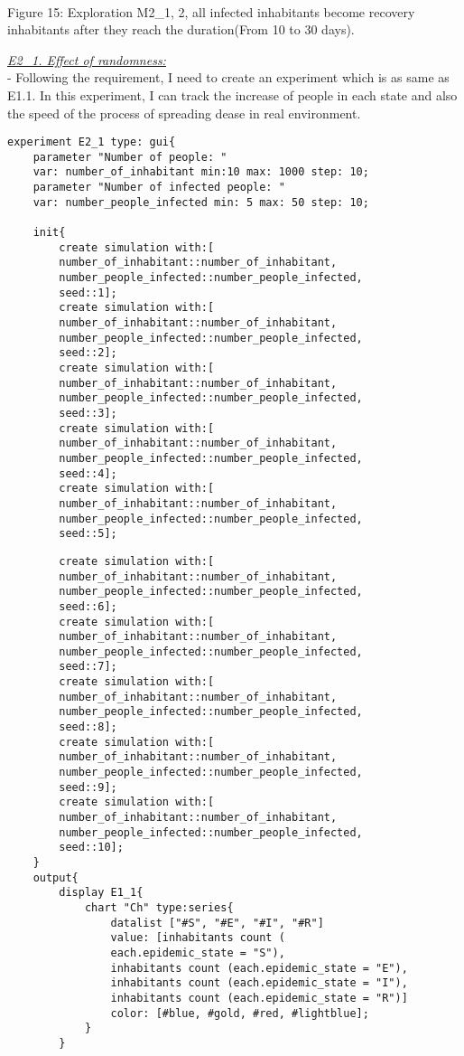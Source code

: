 \documentclass{article}
\begin{document}
\\
\caption{Figure 15: Exploration M2\_1, 2, all infected inhabitants become recovery inhabitants after they reach the duration(From 10 to 30 days).} 
\begin{pic15}
\newpage
\raggedright\underline{\textit{E2\_1. Effect of randomness:}}
\\- Following the requirement, I need to create an experiment which is as same as E1.1. In this experiment, I can track the increase of people in each state and also the speed of the process of spreading dease in real environment.
\\[1\baselineskip]
\begin{tcolorbox}
\begin{lstlisting}
experiment E2_1 type: gui{
	parameter "Number of people: " 
	var: number_of_inhabitant min:10 max: 1000 step: 10;
	parameter "Number of infected people: " 
	var: number_people_infected min: 5 max: 50 step: 10;
	
	init{
		create simulation with:[
		number_of_inhabitant::number_of_inhabitant,
		number_people_infected::number_people_infected,
		seed::1];
		create simulation with:[
		number_of_inhabitant::number_of_inhabitant,
		number_people_infected::number_people_infected,
		seed::2];
		create simulation with:[
		number_of_inhabitant::number_of_inhabitant,
		number_people_infected::number_people_infected,
		seed::3];
		create simulation with:[
		number_of_inhabitant::number_of_inhabitant,
		number_people_infected::number_people_infected,
		seed::4];
		create simulation with:[
		number_of_inhabitant::number_of_inhabitant,
		number_people_infected::number_people_infected,
		seed::5];
\end{lstlisting}
\end{tcolorbox}
\begin{tcolorbox}
\begin{lstlisting}
		create simulation with:[
		number_of_inhabitant::number_of_inhabitant,
		number_people_infected::number_people_infected,
		seed::6];
		create simulation with:[
		number_of_inhabitant::number_of_inhabitant,
		number_people_infected::number_people_infected,
		seed::7];
		create simulation with:[
		number_of_inhabitant::number_of_inhabitant,
		number_people_infected::number_people_infected,
		seed::8];
		create simulation with:[
		number_of_inhabitant::number_of_inhabitant,
		number_people_infected::number_people_infected,
		seed::9];
		create simulation with:[
		number_of_inhabitant::number_of_inhabitant,
		number_people_infected::number_people_infected,
		seed::10];
	}
	output{
		display E1_1{
			chart "Ch" type:series{
				datalist ["#S", "#E", "#I", "#R"] 
				value: [inhabitants count (
				each.epidemic_state = "S"), 
				inhabitants count (each.epidemic_state = "E"), 
				inhabitants count (each.epidemic_state = "I"), 
				inhabitants count (each.epidemic_state = "R")] 
				color: [#blue, #gold, #red, #lightblue];
			}
		}
		

\end{lstlisting}
\end{tcolorbox}
\end{pic15}
\end{document}
